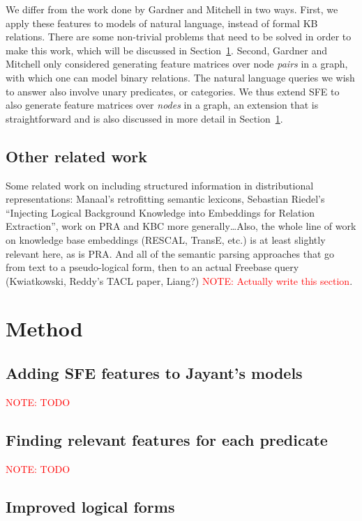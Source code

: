 \documentclass[11pt]{article}
\newcommand{\secref}[1]{Section~\ref{sec:#1}}
\newcommand{\mattnote}[1]{\textcolor{red}{NOTE: #1}}
\begin{document}
We differ from the work done by Gardner and Mitchell in two ways.  First, we
apply these features to models of natural language, instead of formal KB
relations.  There are some non-trivial problems that need to be solved in order
to make this work, which will be discussed in \secref{method}.  Second, Gardner
and Mitchell only considered generating feature matrices over node \emph{pairs}
in a graph, with which one can model binary relations.  The natural language
queries we wish to answer also involve unary predicates, or categories.  We
thus extend SFE to also generate feature matrices over \emph{nodes} in a graph,
an extension that is straightforward and is also discussed in more detail in
\secref{method}.

\subsection{Other related work}

Some related work on including structured information in distributional
representations: Manaal's retrofitting semantic lexicons, Sebastian Riedel's
``Injecting Logical Background Knowledge into Embeddings for Relation
Extraction'', work on PRA and KBC more generally\ldots Also, the whole line of
work on knowledge base embeddings (RESCAL, TransE, etc.) is at least slightly
relevant here, as is PRA.  And all of the semantic parsing approaches that go from text to a
pseudo-logical form, then to an actual Freebase query (Kwiatkowski, Reddy's TACL paper, Liang?) \mattnote{Actually write
this section}.

\section{Method}
\label{sec:method}

\subsection{Adding SFE features to Jayant's models}
\label{sec:formal-and-distributional}

\mattnote{TODO}

\subsection{Finding relevant features for each predicate}
\label{sec:computing-pmi}

\mattnote{TODO}

\subsection{Improved logical forms}
\label{sec:better-lfs}
\end{document}
